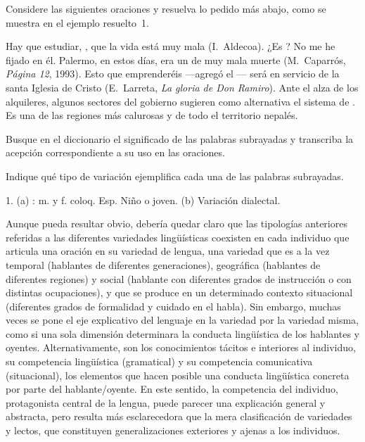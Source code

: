 \begin{ejercicio}\label{ej:02-variacion}
Considere las siguientes oraciones y resuelva lo pedido más abajo, como se
muestra en el ejemplo resuelto~1.

\begin{exe}
  \ex Hay que estudiar, , que la vida está muy mala
      (I.~Aldecoa).
  \ex ¿Es ? No me he fijado en él.
  \ex Palermo, en estos días, era un  de muy mala muerte
      (M.~Caparrós, \textit{Página 12}, 1993).
  \ex Esto que  emprenderéis ---agregó el
      --- será en servicio de la santa Iglesia de Cristo
      (E.~Larreta, \textit{La gloria de Don Ramiro}).
  \ex Ante el alza de los alquileres, algunos sectores del gobierno sugieren
      como alternativa el sistema de .
  \ex Es una de las regiones más calurosas y  de todo el
      territorio nepalés.
\end{exe}

\begin{consignas}
  \item Busque en el diccionario el significado de las palabras subrayadas y
        transcriba la acepción correspondiente a su uso en las oraciones.
  \item Indique qué tipo de variación ejemplifica cada una de las palabras
        subrayadas.
\end{consignas}

\begin{resuelto}
1. (a) : m. y f. coloq. Esp. Niño o joven. (b) Variación
dialectal.
\end{resuelto}
\end{ejercicio}

\begin{recuadro}
Aunque pueda resultar obvio, debería quedar claro que las tipologías anteriores
referidas a las diferentes variedades lingüísticas coexisten en cada individuo
que articula una oración en su variedad de lengua, una variedad que es a la vez
temporal (hablantes de diferentes generaciones), geográfica (hablantes de
diferentes regiones) y social (hablante con diferentes grados de instrucción o
con distintas ocupaciones), y que se produce en un determinado contexto
situacional (diferentes grados de formalidad y cuidado en el habla). Sin
embargo, muchas veces se pone el eje explicativo del lenguaje en la variedad por
la variedad misma, como si una sola dimensión determinara la conducta
lingüística de los hablantes y oyentes. Alternativamente, son los conocimientos
tácitos e interiores al individuo, su competencia lingüística (gramatical) y su
competencia comunicativa (situacional), los elementos que hacen posible una
conducta lingüística concreta por parte del hablante/oyente. En este sentido,
la competencia del individuo, protagonista central de la lengua, puede parecer
una explicación general y abstracta, pero resulta más esclarecedora que la mera
clasificación de variedades y lectos, que constituyen generalizaciones
exteriores y ajenas a los individuos.
\end{recuadro}

